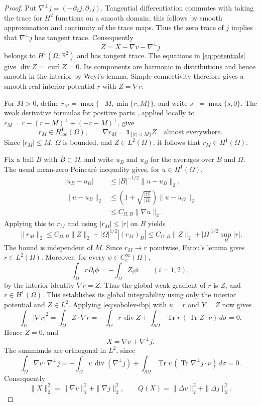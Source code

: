 \begin{proof}
Put $\nabla^\perp j=(-\partial_2j,\partial_1j)$.
Tangential differentiation commutes with taking the trace for $H^2$
functions on a smooth domain; this follows by smooth approximation and
continuity of the trace maps. Thus the zero trace of $j$ implies that
$\nabla^\perp j$ has tangent trace. Consequently
\[
 Z=X-\nabla v-\nabla^\perp j
\]
belongs to $H^1(\Omega;\mathbb R^2)$ and has tangent trace.
The equations in \cref{eq:potentials} give
$\operatorname{div}Z=\operatorname{curl}Z=0$. Its components are
harmonic in distributions and hence smooth in the interior by Weyl's
lemma. Simple connectivity therefore gives a smooth real interior
potential $r$ with $Z=\nabla r$.

For $M>0$, define $r_M=\max\{-M,\min\{r,M\}\}$, and write
$s^+=\max\{s,0\}$.
The weak derivative formulas for positive parts
\cite[Proposition 3.22 and the subsequent discussion, pp.~57--58]{Hunter},
applied locally to
$r_M=r-(r-M)^++(-r-M)^+$, give
\[
 r_M\in H^1_{\mathrm{loc}}(\Omega),\qquad
 \nabla r_M=\mathbf1_{\{|r|<M\}}Z\quad\text{almost everywhere}.
\]
Since $|r_M|\le M$, $\Omega$ is bounded, and $Z\in L^2(\Omega)$,
it follows that $r_M\in H^1(\Omega)$.

Fix a ball $B$ with $\overline B\subset\Omega$, and write $u_B$ and
$u_\Omega$ for the averages over $B$ and $\Omega$. The usual mean-zero
Poincar\'e inequality gives, for $u\in H^1(\Omega)$,
\[
 \begin{aligned}
 |u_B-u_\Omega|
 &\le |B|^{-1/2}\|u-u_\Omega\|_2,\\
 \|u-u_B\|_2
 &\le\left(1+\sqrt{\frac{|\Omega|}{|B|}}\right)
       \|u-u_\Omega\|_2\\
 &\le C_{\Omega,B}\|\nabla u\|_2.
 \end{aligned}
\]
Applying this to $r_M$ and using $|r_M|\le|r|$ on $B$ yields
\[
 \|r_M\|_2
 \le C_{\Omega,B}\|Z\|_2
       +|\Omega|^{1/2}|(r_M)_B|
 \le C_{\Omega,B}\|Z\|_2
       +|\Omega|^{1/2}\sup_B|r|.
\]
The bound is independent of $M$. Since $r_M\to r$ pointwise, Fatou's
lemma gives $r\in L^2(\Omega)$. Moreover, for every
$\phi\in C_c^\infty(\Omega)$,
\[
 \int_\Omega r\,\partial_i\phi=-\int_\Omega Z_i\phi
 \qquad(i=1,2),
\]
by the interior identity $\nabla r=Z$. Thus the global weak gradient of
$r$ is $Z$, and $r\in H^1(\Omega)$. This establishes its global
integrability using only the interior potential and $Z\in L^2$.
Applying \cref{eq:sobolev-ibp} with $u=r$ and $Y=Z$ now gives
\[
 \int_\Omega|\nabla r|^2
 =\int_\Omega Z\cdot\nabla r
 =-\int_\Omega r\,\operatorname{div}Z
   +\int_{\partial\Omega}\operatorname{Tr}r\,
        (\operatorname{Tr}Z\cdot\nu)\,d\sigma=0.
\]
Hence $Z=0$, and
\begin{equation}\label{eq:decomposition}
 X=\nabla v+\nabla^\perp j.
\end{equation}
The summands are orthogonal in $L^2$, since
\[
 \int_\Omega\nabla v\cdot\nabla^\perp j
 =-\int_\Omega v\,\operatorname{div}(\nabla^\perp j)
   +\int_{\partial\Omega}\operatorname{Tr}v\,
       (\operatorname{Tr}\nabla^\perp j\cdot\nu)\,d\sigma=0.
\]
Consequently
\[
 \|X\|_2^2=\|\nabla v\|_2^2+\|\nabla j\|_2^2,
 \qquad Q(X)=\|\Delta v\|_2^2+\|\Delta j\|_2^2.
\]


\end{proof}
